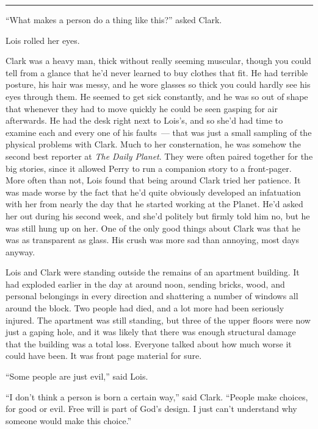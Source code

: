 \documentclass[ebook,12pt]{memoir}
\begin{document}
\begin{center}\rule{0.5\linewidth}{\linethickness}\end{center}

``What makes a person do a thing like this?'' asked Clark.

Lois rolled her eyes.

Clark was a heavy man, thick without really seeming muscular, though you
could tell from a glance that he'd never learned to buy clothes that
fit. He had terrible posture, his hair was messy, and he wore glasses so
thick you could hardly see his eyes through them. He seemed to get sick
constantly, and he was so out of shape that whenever they had to move
quickly he could be seen gasping for air afterwards. He had the desk
right next to Lois's, and so she'd had time to examine each and every
one of his faults~--- that was just a small sampling of the physical
problems with Clark. Much to her consternation, he was somehow the
second best reporter at \emph{The Daily Planet}. They were often paired
together for the big stories, since it allowed Perry to run a companion
story to a front‐pager. More often than not, Lois found that being
around Clark tried her patience. It was made worse by the fact that he'd
quite obviously developed an infatuation with her from nearly the day
that he started working at the Planet. He'd asked her out during his
second week, and she'd politely but firmly told him no, but he was still
hung up on her. One of the only good things about Clark was that he was
as transparent as glass. His crush was more sad than annoying, most days
anyway.

Lois and Clark were standing outside the remains of an apartment
building. It had exploded earlier in the day at around noon, sending
bricks, wood, and personal belongings in every direction and shattering
a number of windows all around the block. Two people had died, and a lot
more had been seriously injured. The apartment was still standing, but
three of the upper floors were now just a gaping hole, and it was likely
that there was enough structural damage that the building was a total
loss. Everyone talked about how much worse it could have been. It was
front page material for sure.

``Some people are just evil,'' said Lois.

``I don't think a person is born a certain way,'' said Clark. ``People
make choices, for good or evil. Free will is part of God's design. I
just can't understand why someone would make this choice.''
\end{document}
